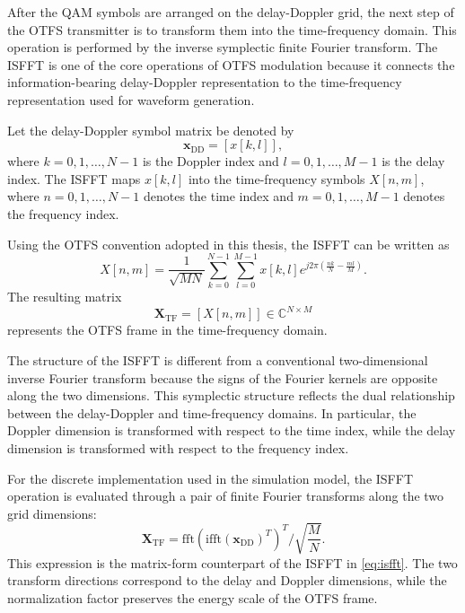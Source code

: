After the QAM symbols are arranged on the delay-Doppler grid, the next step of the OTFS transmitter is to transform them into the time-frequency domain. This operation is performed by the inverse symplectic finite Fourier transform. The ISFFT is one of the core operations of OTFS modulation because it connects the information-bearing delay-Doppler representation to the time-frequency representation used for waveform generation.

Let the delay-Doppler symbol matrix be denoted by
\begin{equation}
    \mathbf{x}_{\mathrm{DD}} = [x[k,l]],
\end{equation}
where \(k=0,1,\ldots,N-1\) is the Doppler index and \(l=0,1,\ldots,M-1\) is the delay index. The ISFFT maps \(x[k,l]\) into the time-frequency symbols \(X[n,m]\), where \(n=0,1,\ldots,N-1\) denotes the time index and \(m=0,1,\ldots,M-1\) denotes the frequency index.

Using the OTFS convention adopted in this thesis, the ISFFT can be written as
\begin{equation}
    X[n,m]
    =
    \frac{1}{\sqrt{MN}}
    \sum_{k=0}^{N-1}
    \sum_{l=0}^{M-1}
    x[k,l]
    e^{j2\pi\left(\frac{nk}{N}-\frac{ml}{M}\right)}.
    \label{eq:isfft}
\end{equation}
The resulting matrix
\begin{equation}
    \mathbf{X}_{\mathrm{TF}}
    =
    [X[n,m]]
    \in \mathbb{C}^{N \times M}
\end{equation}
represents the OTFS frame in the time-frequency domain.

The structure of the ISFFT is different from a conventional two-dimensional inverse Fourier transform because the signs of the Fourier kernels are opposite along the two dimensions. This symplectic structure reflects the dual relationship between the delay-Doppler and time-frequency domains. In particular, the Doppler dimension is transformed with respect to the time index, while the delay dimension is transformed with respect to the frequency index.

For the discrete implementation used in the simulation model, the ISFFT operation is evaluated through a pair of finite Fourier transforms along the two grid dimensions:
\begin{equation}
    \mathbf{X}_{\mathrm{TF}}
    =
    \mathrm{fft}
    \left(
    \mathrm{ifft}
    \left(
    \mathbf{x}_{\mathrm{DD}}
    \right)^T
    \right)^T
    \bigg/
    \sqrt{\frac{M}{N}}.
    \label{eq:isfft_matlab}
\end{equation}
This expression is the matrix-form counterpart of the ISFFT in \eqref{eq:isfft}. The two transform directions correspond to the delay and Doppler dimensions, while the normalization factor preserves the energy scale of the OTFS frame.

